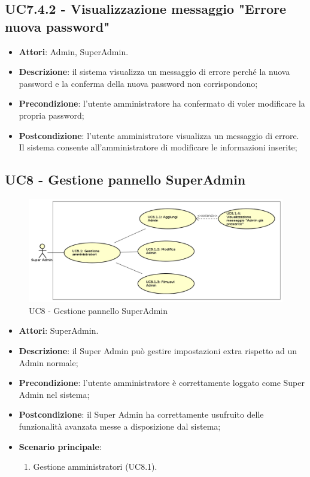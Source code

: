 \documentclass[../AnalisiDeiRequisiti.tex]{subfiles}
\begin{document}
\subsection{UC7.4.2 - Visualizzazione messaggio "Errore nuova password"} 
\label{sssec:UC7.4.2} 
\begin{itemize} 
\item \textbf{Attori}: Admin, SuperAdmin.
\item \textbf{Descrizione}: il sistema visualizza un messaggio di errore perché la nuova password e la conferma della nuova password non corrispondono;
\item \textbf{Precondizione}: l'utente amministratore ha confermato di voler modificare la propria password;
\item \textbf{Postcondizione}: l'utente amministratore visualizza un messaggio di errore. Il sistema consente all'amministratore di modificare le informazioni inserite;
\end{itemize} 
\newpage
\subsection{UC8 - Gestione pannello SuperAdmin} 
\label{sssec:UC8} 
\begin{figure}[!h]
	\centering
	\includegraphics[width=\textwidth]{UseCases/UC8_GestionePannelloSuperadmin/UC8_GestionePannelloSuperadmin.png}
	\caption{UC8 - Gestione pannello SuperAdmin}
\end{figure}
\begin{itemize} 
\item \textbf{Attori}: SuperAdmin.
\item \textbf{Descrizione}: il Super Admin può gestire impostazioni extra rispetto ad un Admin normale;
\item \textbf{Precondizione}: l'utente amministratore è correttamente loggato come Super Admin nel sistema;
\item \textbf{Postcondizione}: il Super Admin ha correttamente usufruito delle funzionalità avanzata messe a disposizione dal sistema;
\item \textbf{Scenario principale}: \begin{enumerate}\item Gestione amministratori (UC8.1). 
 \end{enumerate}
\end{itemize} 
\end{document}
